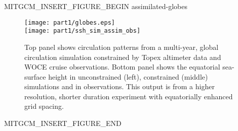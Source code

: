\begin{rawhtml}MITGCM_INSERT_FIGURE_BEGIN assimilated-globes\end{rawhtml}
\begin{figure}
 \begin{center}
   \texttt{[image: part1/globes.eps]}
\\
   \texttt{[image: part1/ssh\_sim\_assim\_obs]}
 \end{center}
\caption{Top panel shows circulation patterns from a
multi-year, global circulation simulation constrained by Topex altimeter
data and WOCE cruise observations. Bottom panel shows the equatorial
sea-surface height in unconstrained (left), constrained (middle) simulations
and in observations. This output is from a higher resolution, shorter
duration experiment with equatorially enhanced grid spacing.}
\label{fig:assimilated-globes}
\end{figure}
\begin{rawhtml}MITGCM_INSERT_FIGURE_END\end{rawhtml}
